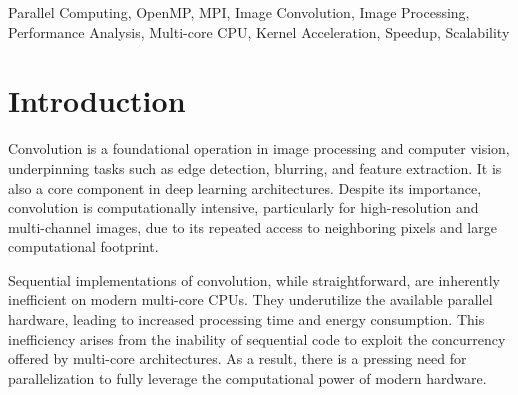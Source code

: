 \documentclass[conference, 10pt]{IEEEtran}
\begin{document}
\begin{IEEEkeywords}
Parallel Computing, OpenMP, MPI, Image Convolution, Image Processing, Performance Analysis, Multi-core CPU, Kernel Acceleration, Speedup, Scalability
\end{IEEEkeywords}


\section{Introduction}
Convolution is a foundational operation in image processing and computer vision, 
underpinning tasks such as edge detection, blurring, and feature extraction. It is also a core component in deep learning architectures. 
Despite its importance, convolution is computationally intensive, particularly for high-resolution and multi-channel images, 
due to its repeated access to neighboring pixels and large computational footprint.

Sequential implementations of convolution, while straightforward, are inherently inefficient on modern multi-core CPUs. 
They underutilize the available parallel hardware, leading to increased processing time and energy consumption. 
This inefficiency arises from the inability of sequential code to exploit the concurrency offered by multi-core architectures.
As a result, there is a pressing need for parallelization to fully leverage the computational power of modern hardware. 
\end{document}
